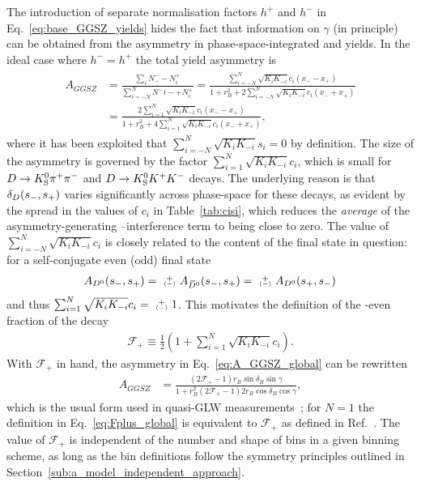 The introduction of separate normalisation factors $h^+$ and $h^-$ in Eq.~\eqref{eq:base_GGSZ_yields} hides the fact that information on $\gamma$ (in principle) can be obtained from the asymmetry in phase-space-integrated \Bp and \Bm yields. In the ideal case where $h^-=h^+$ the total yield asymmetry is 
\begin{align}\begin{split}\label{eq:A_GGSZ_global}
    A_{GGSZ} &= \frac{\sum_i N^-_- - N^+_i}{\sum_{i=-N}^N N^-i- + N^+_i}
    = \frac{ \sum_{i=-N}^N \sqrt{K_iK_{-i}}c_i (x_- - x_+)}{1 + r_B^2 +2 \sum_{i=-N}^N \sqrt{K_iK_{-i}}c_i (x_- + x_+)} \\
    &=\frac{2 \sum_{i=1}^N \sqrt{K_iK_{-i}}c_i (x_- - x_+)}{1 + r_B^2 +4 \sum_{i=1}^N \sqrt{K_iK_{-i}}c_i (x_- + x_+) },
\end{split}\end{align}
where it has been exploited that $\sum_{i=-N}^N \sqrt{K_iK_{-i}}s_i=0$ by definition. The size of the asymmetry is governed by the factor $\sum_{i=1}^N \sqrt{K_iK_{-i}}c_i$, which is small for ${{D}\rightarrow{\ensuremath{{K}^0_{\mathrm{S}}}}{\ensuremath{{\pi}^+}}{\ensuremath{{\pi}^-}}}$ and ${D}\rightarrow{\ensuremath{{K}^0_{\mathrm{S}}}}{\ensuremath{{K}^+}}{\ensuremath{{K}^-}}$ decays. The underlying reason is that $\delta_D(s_-, s_+)$ varies significantly across phase-space for these decays, as evident by the spread in the values of $c_i$ in Table~\ref{tab:cisi}, which reduces the \emph{average} of the asymmetry-generating \Dz--\Dzb interference term to being close to zero. The value of $\sum_{i=-N}^N \sqrt{K_iK_{-i}}c_i$ is closely related to the \CP content of the final state in question: for a self-conjugate \CP even (odd) final state  
\begin{align}
    {A_\Dz(\sm, \sp)=\varpm A_\Dzb(\sm, \sp)=\varpm A_\Dz(\sp, \sm)}
\end{align}
 and thus $\sum_{i=1}^N \sqrt{K_iK_{-i}}c_i= \varpm 1$. This motivates the definition of the \CP-even fraction of the decay
\begin{align}\label{eq:Fplus_global}
    \mathcal F_+ \equiv \frac{1}{2}\left(1 + \sum_{i=1}^N \sqrt{K_i K_{-i}}c_i\right).
\end{align}
 With $\mathcal F_+$ in hand, the asymmetry in Eq.~\eqref{eq:A_GGSZ_global} can be rewritten
\begin{align}
    A_{GGSZ} &= \frac{(2\mathcal F_+-1) r_B \sin \delta_B \sin \gamma}{1 + r_B^2 (2\mathcal F_+-1) 2 r_B \cos \delta_B \cos \gamma},
\end{align}
which is the usual form used in quasi-GLW measurements~\cite{}; for $N=1$ the definition in Eq.~\eqref{eq:Fplus_global} is equivalent to $\mathcal F_+$ as defined in Ref.~\cite{}. The value of $\mathcal F_+$ is independent of the number and shape of bins in a given binning scheme, as long as the bin definitions follow the symmetry principles outlined in Section~\ref{sub:a_model_independent_approach}. 
